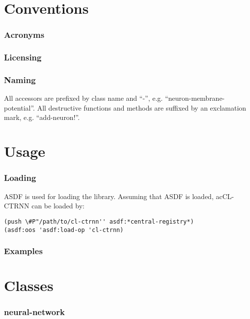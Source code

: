 \documentclass[english]{article}
\begin{document}
\part{Conventions}
\section{Acronyms}

\begin{acronym}
\end{acronym}

\section{Licensing}

\section{Naming}
All accessors are prefixed by class name and ``-'', e.g. ``neuron-membrane-potential''. All destructive functions and methods are suffixed by an exclamation mark, e.g. ``add-neuron!''.

\newpage
\part{Usage}
\newpage
\section{Loading}
\ac{ASDF} is used for loading the library. Assuming that \ac{ASDF} is loaded, ac{CL-CTRNN} can be loaded by:

\begin{lstlisting}
(push \#P"/path/to/cl-ctrnn'' asdf:*central-registry*)
(asdf:oos 'asdf:load-op 'cl-ctrnn)
\end{lstlisting}

\section{Examples}


\newpage
\part{Classes}
\newpage
\section{neural-network}
\label{neural-network}
\end{document}
